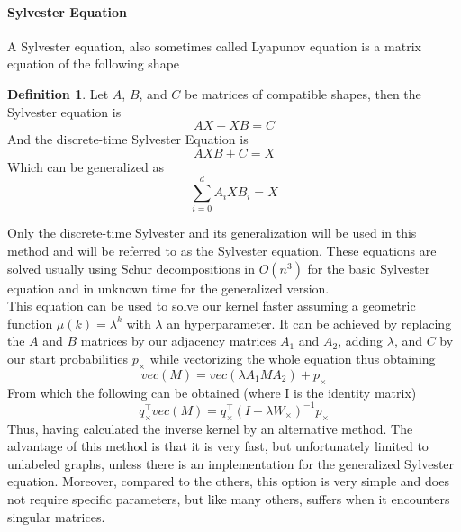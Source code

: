 \documentclass{article}
\theoremstyle{definition}
\newtheorem{definition}{Definition}
\begin{document}
\paragraph{Sylvester Equation}
A Sylvester equation, also sometimes called Lyapunov equation is a matrix equation of the following shape 
\begin{definition}
	Let $A$, $B$, and $C$ be matrices of compatible shapes, then the Sylvester equation is
	\begin{equation}
	AX+XB=C
	\end{equation}
	And the discrete-time Sylvester Equation is 
	\begin{equation}
	AXB+C=X
	\end{equation}
	Which can be generalized as
	\begin{equation}
		\sum_{i=0}^{d}A_{i}XB_{i}=X
	\end{equation}
\end{definition}
Only the discrete-time Sylvester and its generalization will be used in this method and will be referred to as the Sylvester equation. These equations are solved usually using Schur decompositions in $O(n^3)$ for the basic Sylvester equation and in unknown time for the generalized version\cite{vishwanathan_graph_2010}.\\
This equation can be used to solve our kernel faster assuming a geometric function $\mu(k)=\lambda^k$ with $\lambda$ an hyperparameter. It can be achieved by replacing the $A$ and $B$ matrices by our adjacency matrices $A_1$ and $A_2$, adding $\lambda$, and $C$ by our start probabilities $p_\times$ while vectorizing the whole equation thus obtaining
\begin{equation}
	vec(M) = vec(\lambda A_{1}MA_{2}) + p_{\times}
\end{equation}
From which the following can be obtained (where I is the identity matrix)
\begin{equation}
	q_{\times}^{\top}vec(M)=q_{\times}^{\top}(I-\lambda W_{\times})^{-1}p_{\times}
\end{equation}
Thus, having calculated the inverse kernel by an alternative method. The advantage of this method is that it is very fast, but unfortunately limited to unlabeled graphs, unless there is an implementation for the generalized Sylvester equation. Moreover, compared to the others, this option is very simple and does not require specific parameters, but like many others, suffers when it encounters singular matrices. 
\end{document}
